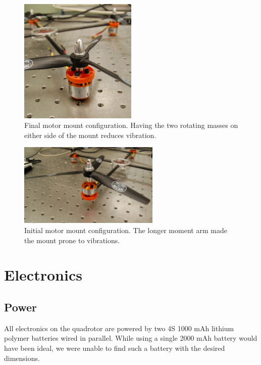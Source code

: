 \documentclass[12pt,letterpaper]{article} \usepackage[margin=1in]{geometry}
\begin{document}
\begin{figure}[!h]
	\centering
	\includegraphics[width=0.5\textwidth]{img/motor_mount_final.jpg}
	\caption{Final motor mount configuration. Having the two rotating masses on either side of the mount reduces vibration.}
	\label{fig:mmf}
\end{figure}

\begin{figure}[!h]
	\centering
	\includegraphics[width=0.6\textwidth]{img/motor_mount_initial.jpg}
	\caption{Initial motor mount configuration. The longer moment arm made the mount prone to vibrations.}
	\label{fig:mmi}
\end{figure}



\section*{Electronics}

\subsection*{Power}

All electronics on the quadrotor are powered by two 4S 1000 mAh lithium polymer
batteries wired in parallel. While using a single 2000 mAh battery would have
been ideal, we were unable to find such a battery with the desired dimensions.
\end{document}
